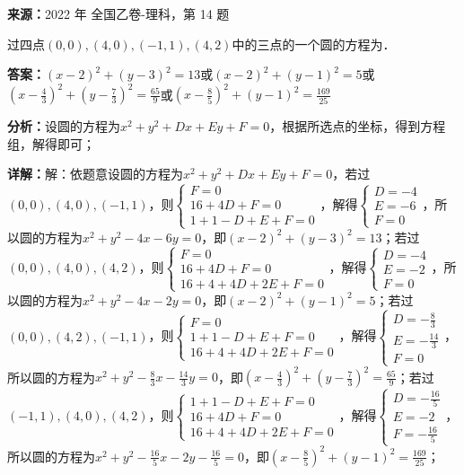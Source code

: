 \begin{question}[points=5]
\textbf{来源：}2022 年 全国乙卷-理科，第 14 题\par
过四点$(0,0),(4,0),(-1,1),(4,2)$中的三点的一个圆的方程为．
\fillin[{$(x-2)^2 + (y-3)^2 = 13$或$(x-2)^2 + (y-1)^2 = 5$或$\left(x-\frac{4}{3}\right)^2 + \left(y-\frac{7}{3}\right)^2 = \frac{65}{9}$或$\left(x-\frac{8}{5}\right)^2 + (y-1)^2 = \frac{169}{25}$}]
\begin{solution}
\textbf{答案：}$(x-2)^2 + (y-3)^2 = 13$或$(x-2)^2 + (y-1)^2 = 5$或$\left(x-\frac{4}{3}\right)^2 + \left(y-\frac{7}{3}\right)^2 = \frac{65}{9}$或$\left(x-\frac{8}{5}\right)^2 + (y-1)^2 = \frac{169}{25}$

\textbf{分析：}设圆的方程为$x^2+y^2+Dx+Ey+F=0$，根据所选点的坐标，得到方程组，解得即可；

\textbf{详解：}解：依题意设圆的方程为$x^2+y^2+Dx+Ey+F=0$，若过$(0,0),(4,0),(-1,1)$，则$\begin{cases} F=0 \\ 16+4D+F=0 \\ 1+1-D+E+F=0 \end{cases}$，解得$\begin{cases} D=-4 \\ E=-6 \\ F=0 \end{cases}$，所以圆的方程为$x^2+y^2-4x-6y=0$，即$(x-2)^2+(y-3)^2=13$；若过$(0,0),(4,0),(4,2)$，则$\begin{cases} F=0 \\ 16+4D+F=0 \\ 16+4+4D+2E+F=0 \end{cases}$，解得$\begin{cases} D=-4 \\ E=-2 \\ F=0 \end{cases}$，所以圆的方程为$x^2+y^2-4x-2y=0$，即$(x-2)^2+(y-1)^2=5$；若过$(0,0),(4,2),(-1,1)$，则$\begin{cases} F=0 \\ 1+1-D+E+F=0 \\ 16+4+4D+2E+F=0 \end{cases}$，解得$\begin{cases} D=-\frac{8}{3} \\ E=-\frac{14}{3} \\ F=0 \end{cases}$，所以圆的方程为$x^2+y^2-\frac{8}{3}x-\frac{14}{3}y=0$，即$\left(x-\frac{4}{3}\right)^2+\left(y-\frac{7}{3}\right)^2=\frac{65}{9}$；若过$(-1,1),(4,0),(4,2)$，则$\begin{cases} 1+1-D+E+F=0 \\ 16+4D+F=0 \\ 16+4+4D+2E+F=0 \end{cases}$，解得$\begin{cases} D=-\frac{16}{5} \\ E=-2 \\ F=-\frac{16}{5} \end{cases}$，所以圆的方程为$x^2+y^2-\frac{16}{5}x-2y-\frac{16}{5}=0$，即$\left(x-\frac{8}{5}\right)^2+(y-1)^2=\frac{169}{25}$；
\end{solution}
\end{question}


